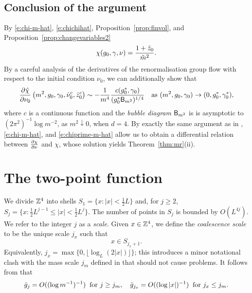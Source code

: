 \subsection{Conclusion of the argument}

By \eqref{e:chi-m-hat}, \eqref{e:chichihat}, Proposition~\ref{prop:finvol},
and Proposition~\ref{prop:changevariables2}
\begin{equation}
\chi(g_0, \gamma, \nu)
	=
\frac{1 + \tilde z_0}{\tilde m^2}.
\end{equation}
By a careful analysis of the derivatives of the renormalisation group flow with
respect to the initial condition $\nu_0$, we can additionally show that
\begin{equation}
\label{e:chiprime-m-hat}
\frac{\partial \hat\chi}{\partial \nu_0} \left(m^2,g_0, \gamma_0,\hat\nu_0^c, \hat z_0^c \right)
	\sim
-\frac{1}{m^4} \frac{c(g_0^*, \gamma_0)}{(g_0^*{\sf B}_{m^2})^{1/4}}
	\quad
\text{as $(m^2,g_0,\gamma_0) \rightarrow (0,g_0^*,\gamma_0^*)$},
\end{equation}
where $c$ is a continuous function
and the \emph{bubble diagram} ${\sf B}_{m^2}$ is
is asymptotic to $(2\pi^2)^{-1} \log m^{-2}$, as $m^2 \downarrow 0$, when $d = 4$.
By exactly the same argument as in \cite[Section~\ref{log-sec:pfsuscept}]{BBS-saw4-log},
\eqref{e:chi-m-hat}, and \eqref{e:chiprime-m-hat} allow us to obtain
a differential relation between $\frac{\partial \chi}{\partial \nu}$ and $\chi$,
whose solution yields Theorem~\ref{thm:mr}(ii).


\section{The two-point function}

We divide ${\mathbb Z}^4$ into shells $S_1 = \{x : |x| < \frac 12 L\}$ and, for $j \ge 2$,
$S_j = \{x : \frac 12 L^{j-1} \le |x| < \frac 12 L^{j}\}$.
The number of points in $S_j$ is bounded by $O(L^{4j})$.
We refer to the integer $j$ as a \emph{scale}.
Given $x\in {\mathbb Z}^4$, we define the \emph{coalescence scale}
to be the unique scale $j_x$ such that
\begin{equation}
   \label{e:Phi-def-jc}
    x \in S_{j_x +1}
   .
\end{equation}
Equivalently, $j_{x} = \max\{0,\lfloor \log_{L} (2 |x|)\rfloor\}$; this introduces a minor
notational clash with the mass scale $j_m$ defined in 
that should not cause problems.
It follows from \cite[Proposition~\ref{log-prop:approximate-flow}]{BBS-saw4-log} that
\begin{equation}
\label{e:gjxgjmbd}
\bar{g}_{j}
	=
O((\log m^{-1})^{-1}) \;\; \text{for $j \geq j_m$},
	\quad
\bar{g}_{j_x}
	=
O((\log |x|)^{-1}) \;\; \text{for $j_x \leq j_m$.}
\end{equation}

